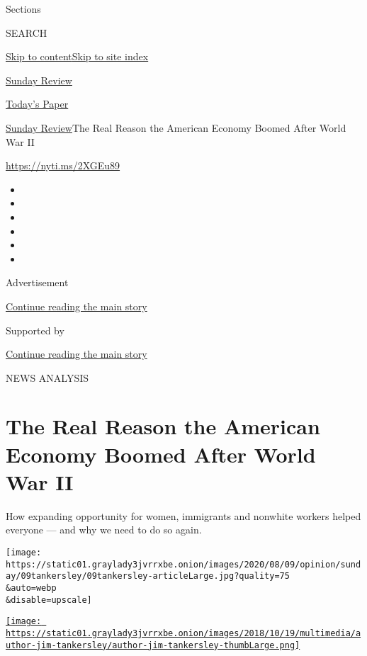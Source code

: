 Sections

SEARCH

\protect\hyperlink{site-content}{Skip to
content}\protect\hyperlink{site-index}{Skip to site index}

\href{https://www.nytimes3xbfgragh.onion/pages/opinion/index.html\#sundayreview}{Sunday
Review}

\href{https://myaccount.nytimes3xbfgragh.onion/auth/login?response_type=cookie\&client_id=vi}{}

\href{https://www.nytimes3xbfgragh.onion/section/todayspaper}{Today's
Paper}

\href{/pages/opinion/index.html}{Sunday Review}\textbar{}The Real Reason
the American Economy Boomed After World War II

\url{https://nyti.ms/2XGEu89}

\begin{itemize}
\item
\item
\item
\item
\item
\item
\end{itemize}

Advertisement

\protect\hyperlink{after-top}{Continue reading the main story}

Supported by

\protect\hyperlink{after-sponsor}{Continue reading the main story}

NEWS ANALYSIS

\hypertarget{the-real-reason-the-american-economy-boomed-after-world-war-ii}{%
\section{The Real Reason the American Economy Boomed After World War
II}\label{the-real-reason-the-american-economy-boomed-after-world-war-ii}}

How expanding opportunity for women, immigrants and nonwhite workers
helped everyone --- and why we need to do so again.

\texttt{[image: https://static01.graylady3jvrrxbe.onion/images/2020/08/09/opinion/sunday/09tankersley/09tankersley-articleLarge.jpg?quality=75\\\&auto=webp\\\&disable=upscale]}

\href{https://www.nytimes3xbfgragh.onion/by/jim-tankersley}{\texttt{[image: https://static01.graylady3jvrrxbe.onion/images/2018/10/19/multimedia/author-jim-tankersley/author-jim-tankersley-thumbLarge.png]}}

